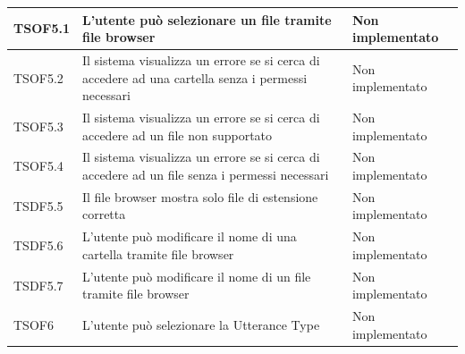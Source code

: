 \documentclass[openany,12pt,a4paper]{report}
\begin{document}
\begin{longtable}{| p{2cm} |p{5cm} | p{2.5cm} |}
	\newline TSOF5.1&
	\newline L'utente può selezionare un file tramite file browser&
	\newline Non implementato
	\\[1em]	
	\hline
	
	\newline TSOF5.2&
	\newline Il sistema visualizza un errore se si cerca di accedere ad una cartella senza i permessi necessari&
	\newline Non implementato
	\\[1em]	
	\hline
	
	\newline TSOF5.3&
	\newline Il sistema visualizza un errore se si cerca di accedere ad un file non supportato&
	\newline Non implementato
	\\[1em]	
	\hline
	
	\newline TSOF5.4&
	\newline Il sistema visualizza un errore se si cerca di accedere ad un file senza i permessi necessari&
	\newline Non implementato
	\\[1em]	
	\hline
	
	\newline TSDF5.5&
	\newline Il file browser mostra solo file di estensione corretta&
	\newline Non implementato
	\\[1em]
	\hline
	\newline TSDF5.6&
	\newline L'utente può modificare il nome di una cartella tramite file browser&
	\newline Non implementato
	\\[1em]
	\hline
	\newline TSDF5.7&
	\newline L'utente può modificare il nome di un file tramite file browser&
	\newline Non implementato
	\\[1em]
	\hline
	\newline TSOF6&
	\newline L'utente può selezionare la Utterance Type&
	\newline Non implementato
	\\[1em]
	\hline
	

\end{longtable}
\end{document}
